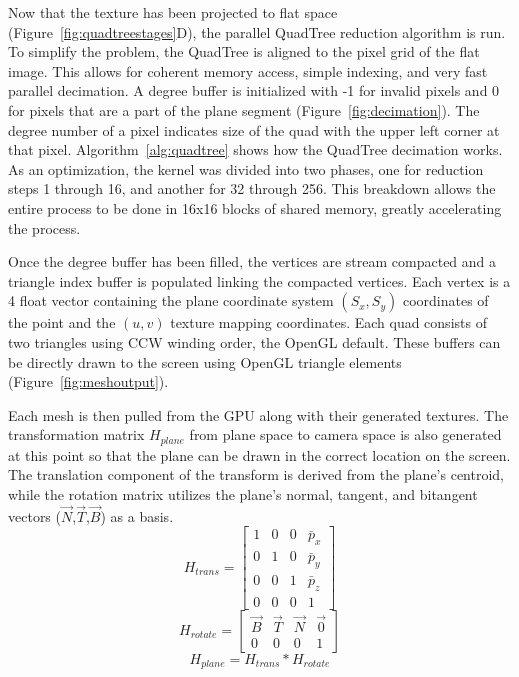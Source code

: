 Now that the texture has been projected to flat space (Figure~\ref{fig:quadtreestages}D), the parallel QuadTree reduction algorithm is run. To simplify the problem, the QuadTree is aligned to the pixel grid of the flat image. This allows for coherent memory access, simple indexing, and very fast parallel decimation. A degree buffer is initialized with -1 for invalid pixels and 0 for pixels that are a part of the plane segment (Figure~\ref{fig:decimation}). The degree number of a pixel indicates size of the quad with the upper left corner at that pixel. Algorithm~\ref{alg:quadtree} shows how the QuadTree decimation works. As an optimization, the kernel was divided into two phases, one for reduction steps 1 through 16, and another for 32 through 256. This breakdown allows the entire process to be done in 16x16 blocks of shared memory, greatly accelerating the process.\par
Once the degree buffer has been filled, the vertices are stream compacted and a triangle index buffer is populated linking the compacted vertices. Each vertex is a 4 float vector containing the plane coordinate system $(S_x,S_y)$ coordinates of the point and the $(u,v)$ texture mapping coordinates. Each quad consists of two triangles using CCW winding order, the OpenGL default. These buffers can be directly drawn to the screen using OpenGL triangle elements (Figure~\ref{fig:meshoutput}).\par
Each mesh is then pulled from the GPU along with their generated textures. The transformation matrix $H_{plane}$ from plane space to camera space is also generated at this point so that the plane can be drawn in the correct location on the screen. The translation component of the transform is derived from the plane's centroid, while the rotation matrix utilizes the plane's normal, tangent, and bitangent vectors ($\vec{N}$,$\vec{T}$,$\vec{B}$) as a basis.
$$H_{trans} = \begin{bmatrix}
  1 & 0 & 0 & \bar{p}_x \\
  0 & 1 & 0 & \bar{p}_y \\
  0 & 0 & 1 & \bar{p}_z \\
  0 & 0 & 0 & 1
 \end{bmatrix}$$
 $$H_{rotate} = \begin{bmatrix}
  \vec{B} & \vec{T} & \vec{N} & \vec{0} \\
  0 & 0 & 0 & 1
 \end{bmatrix}$$
$$H_{plane} = H_{trans}*H_{rotate}$$
